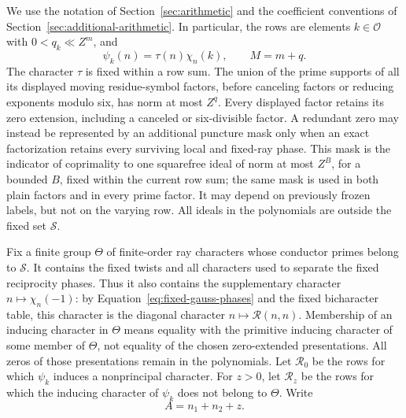 \documentclass[11pt,a4paper]{article}
\numberwithin{equation}{section}
\numberwithin{figure}{section}
\theoremstyle{definition}
\theoremstyle{remark}
\begin{document}
We use the notation of Section~\ref{sec:arithmetic} and the coefficient
conventions of Section~\ref{sec:additional-arithmetic}.  In particular, the
rows are elements \(k\in\mathcal O\) with \(0<q_k\ll Z^m\), and
\[
 \psi_k(n)=\tau(n)\chi_n(k),\qquad M=m+q.
\]
The character \(\tau\) is fixed within a row sum.  The union of the
prime supports of all its displayed moving residue-symbol factors,
before canceling factors or reducing exponents modulo six, has norm at
most \(Z^q\).  Every displayed factor retains its zero extension,
including a canceled or six-divisible factor.  A redundant zero may
instead be represented by an additional puncture mask only when an exact
factorization retains every surviving local and fixed-ray phase.  This
mask is the indicator of coprimality to one squarefree ideal of norm at
most \(Z^B\), for a bounded \(B\), fixed within the current row sum;
the same mask is used in both plain factors and in every prime factor.
It may depend on previously frozen labels, but not on the varying row.
All ideals in the polynomials are outside the fixed set \(\mathcal S\).

Fix a finite group \(\Theta\) of finite-order ray characters whose
conductor primes belong to \(\mathcal S\).  It contains the fixed
twists and all characters used to separate the fixed reciprocity
phases.  Thus it also contains the supplementary character
\(n\mapsto\chi_n(-1)\): by
Equation~\eqref{eq:fixed-gauss-phases} and the fixed bicharacter
table, this character is the diagonal character
\(n\mapsto\mathcal R(n,n)\).  Membership of an inducing character in
\(\Theta\) means equality with the primitive inducing character of some
member of \(\Theta\), not equality of the chosen zero-extended
presentations.  All zeros of those presentations remain in the polynomials.
Let \(\mathcal R_0\) be the rows for which
\(\psi_k\) induces a nonprincipal character.  For \(z>0\), let
\(\mathcal R_z\) be the rows for which the inducing character of
\(\psi_k\) does not belong to \(\Theta\).  Write
\begin{equation}
 A=n_1+n_2+z.
 \label{old-eq:3.1}
\end{equation}
\end{document}
